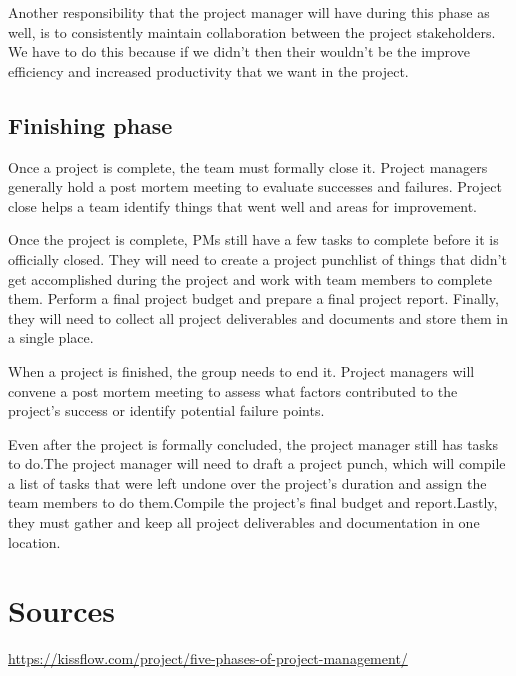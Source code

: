 \documentclass{article}
\begin{document}
Another responsibility that the project manager will have during this phase as well, is to consistently maintain collaboration between the project stakeholders. We have to do this because if we didn't then their wouldn't be the improve efficiency and increased productivity that we want in the project.

\subsection{Finishing phase}

Once a project is complete, the team must formally close it. Project managers generally hold a post mortem meeting to evaluate successes and failures. Project close helps a team identify things that went well and areas for improvement.

Once the project is complete, PMs still have a few tasks to complete before it is officially closed. They will need to create a project punchlist of things that didn’t get accomplished during the project and work with team members to complete them. Perform a final project budget and prepare a final project report. Finally, they will need to collect all project deliverables and  documents and store them in a single place. 

When a project is finished, the group needs to end it. Project managers will convene a post mortem meeting to assess what factors contributed to the project's success or identify potential failure points.

Even after the project is formally concluded, the project manager still has tasks to do.The project manager will need to draft a project punch, which will compile a list of tasks that were left undone over the project's duration and assign the team members to do them.Compile the project's final budget and report.Lastly, they must gather and keep all project deliverables and documentation in one location.    

\break



\section{Sources}
\url{https://kissflow.com/project/five-phases-of-project-management/}
\end{document}
